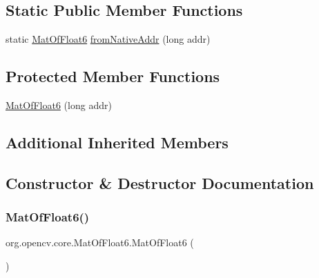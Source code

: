 \subsection*{Static Public Member Functions}
\begin{DoxyCompactItemize}
\item 
static \mbox{\hyperlink{classorg_1_1opencv_1_1core_1_1_mat_of_float6}{Mat\+Of\+Float6}} \mbox{\hyperlink{classorg_1_1opencv_1_1core_1_1_mat_of_float6_a1f13ea350645692bc19e8f312393f7b9}{from\+Native\+Addr}} (long addr)
\end{DoxyCompactItemize}
\subsection*{Protected Member Functions}
\begin{DoxyCompactItemize}
\item 
\mbox{\hyperlink{classorg_1_1opencv_1_1core_1_1_mat_of_float6_a9c463e4e4590c686142c6854cd5a5c31}{Mat\+Of\+Float6}} (long addr)
\end{DoxyCompactItemize}
\subsection*{Additional Inherited Members}


\subsection{Constructor \& Destructor Documentation}
\mbox{\label{classorg_1_1opencv_1_1core_1_1_mat_of_float6_a6d52fe89a4b8f8bbd0274423870530dc}} 
\subsubsection{\texorpdfstring{Mat\+Of\+Float6()}{MatOfFloat6()}\hspace{0.1cm}{\footnotesize\ttfamily [1/4]}}
{\footnotesize\ttfamily org.\+opencv.\+core.\+Mat\+Of\+Float6.\+Mat\+Of\+Float6 (\begin{DoxyParamCaption}{ }\end{DoxyParamCaption})}

\mbox{\label{classorg_1_1opencv_1_1core_1_1_mat_of_float6_a9c463e4e4590c686142c6854cd5a5c31}} 
